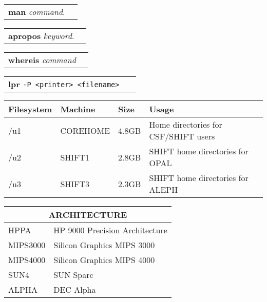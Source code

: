 \newpage

{\samepage \clearpage \begin{tabular}{ll}
{\bf man} {\it command}.
\end{tabular}
}


\newpage

{\samepage \clearpage \begin{tabular}{ll}
{\bf apropos} {\it keyword}.
\end{tabular}
}


\newpage

{\samepage \clearpage \begin{tabular}{ll}
{\bf whereis} {\it command}
\end{tabular}
}


\newpage

{\samepage \clearpage \begin{tabular}{ll}
{\bf lpr} {\tt -P <printer>  <filename> }
\end{tabular}
}


\newpage

{\samepage \clearpage \begin{tabular}{llll}
Filesystem& Machine& Size &Usage  \\  
\hline
/u1&COREHOME& 4.8GB &Home directories for CSF/SHIFT users \\  
/u2&SHIFT1  & 2.8GB &SHIFT home directories for OPAL      \\  
/u3&SHIFT3  & 2.3GB &SHIFT home directories for ALEPH     \\  
\end{tabular}
}


\newpage

{\samepage \clearpage \begin{tabular}{ll}
\multicolumn{2}{c}{ARCHITECTURE} \\  
\hline
HPPA       &HP 9000 Precision Architecture \\  
MIPS3000   &Silicon Graphics MIPS 3000     \\  
MIPS4000   &Silicon Graphics MIPS 4000     \\  
SUN4       &SUN Sparc                      \\  
ALPHA      &DEC Alpha                      \\  
\end{tabular}
}



